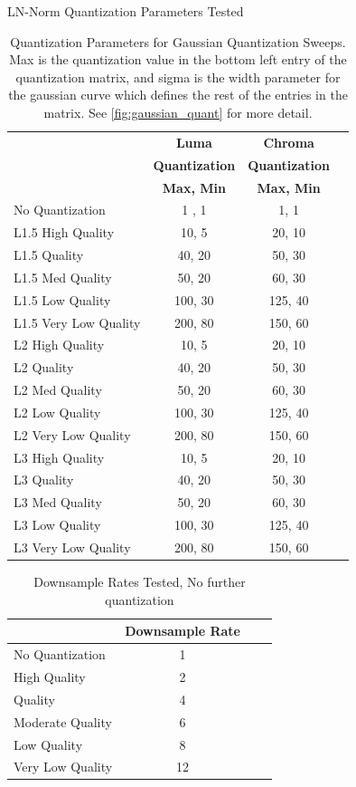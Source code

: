 \begin{table}[h!]
    \centering
    \caption{LN-Norm Quantization Parameters Tested}
    \begin{tabularx}{0.5\textwidth}{X c c c}
        \toprule
        \ & \textbf{Luma} & \textbf{Chroma} \\
        \ & \textbf{Quantization} & \textbf{Quantization} \\
        \ & \textbf{Max, Min} & \textbf{Max, Min} \\
        \midrule
        No Quantization & 1 , 1 & 1, 1 \\
        L1.5 High Quality & 10, 5 & 20, 10 \\
        L1.5 Quality & 40, 20 & 50, 30 \\
        L1.5 Med Quality & 50, 20 & 60, 30 \\
        L1.5 Low Quality & 100, 30 & 125, 40 \\
        L1.5 Very Low Quality & 200, 80 & 150, 60 \\
        L2 High Quality & 10, 5 & 20, 10 \\
        L2 Quality & 40, 20 & 50, 30 \\
        L2 Med Quality & 50, 20 & 60, 30 \\
        L2 Low Quality & 100, 30 & 125, 40 \\
        L2 Very Low Quality & 200, 80 & 150, 60 \\
        L3 High Quality & 10, 5 & 20, 10 \\
        L3 Quality & 40, 20 & 50, 30 \\
        L3 Med Quality & 50, 20 & 60, 30 \\
        L3 Low Quality & 100, 30 & 125, 40 \\
        L3 Very Low Quality & 200, 80 & 150, 60 \\
        \bottomrule
    \end{tabularx}
    \caption{Quantization Parameters for Gaussian Quantization Sweeps. Max is the quantization value in the bottom left entry of the quantization matrix, and sigma is the width parameter for the gaussian curve which defines the rest of the entries in the matrix. See \ref{fig:gaussian_quant} for more detail.}
    \label{tab:Quantization-Parameters-LN-Norm}
\end{table}

\begin{table}[h!]
    \centering
    \caption{Downsample Rates Tested, No further quantization}
    \begin{tabularx}{0.5\textwidth}{X c c c}
        \toprule
        \ & \textbf{Downsample Rate} \\
        \midrule
        No Quantization & 1 \\
        High Quality & 2 \\
        Quality & 4 \\
        Moderate Quality & 6 \\
        Low Quality & 8 \\
        Very Low Quality & 12 \\
        \bottomrule
    \end{tabularx}
    \label{tab:Downsample Parameters}
\end{table}

